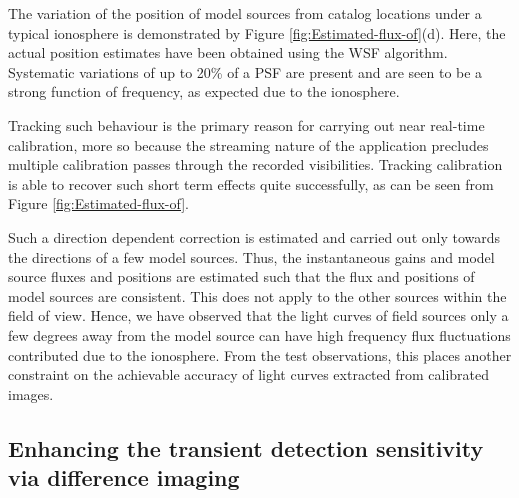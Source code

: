 \documentclass{aa}
\begin{document}
The variation  of the position of  model sources from catalog  locations under a
typical  ionosphere is  demonstrated  by Figure  \ref{fig:Estimated-flux-of}(d).
Here,  the  actual   position  estimates  have  been  obtained   using  the  WSF
algorithm. Systematic variations of up to 20\% of a PSF are present and are seen
to be a strong function of frequency, as expected due to the ionosphere.

Tracking such  behaviour is the primary  reason for carrying  out near real-time
calibration, more so  because the streaming nature of  the application precludes
multiple  calibration   passes  through  the   recorded  visibilities.  Tracking
calibration is  able to recover such  short term effects  quite successfully, as
can be seen from Figure \ref{fig:Estimated-flux-of}.

Such a direction dependent correction  is estimated and carried out only towards
the directions of  a few model sources. Thus, the  instantaneous gains and model
source fluxes  and positions are estimated  such that the flux  and positions of
model sources  are consistent. This does  not apply to the  other sources within
the  field of  view. Hence,  we have  observed that  the light  curves  of field
sources only  a few degrees away from  the model source can  have high frequency
flux fluctuations contributed due to the ionosphere. From the test observations,
this  places another  constraint  on  the achievable  accuracy  of light  curves
extracted from calibrated images.


\subsection{\label{sub:Enhancing-the-transient}Enhancing the transient detection
sensitivity via difference imaging} 
\end{document}
